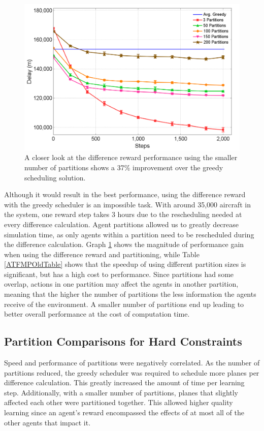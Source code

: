\documentclass[onehalf,11pt]{beavtex}
\begin{document}
\begin{figure}
\centering
\includegraphics[width=1.0\columnwidth]{ATFMPOldDvsGreedy}
\caption{A closer look at the difference reward performance using the smaller number of partitions shows a 37\% improvement over the greedy scheduling solution.}
\label{ATFMPOldDvsGreedy}
\end{figure}

Although it would result in the best performance, using the difference reward with the greedy scheduler is an impossible task. With around 35,000 aircraft in the system, one reward step takes 3 hours due to the rescheduling needed at every difference calculation. Agent partitions allowed us to greatly decrease simulation time, as only agents within a partition need to be rescheduled during the difference calculation. Graph \ref{ATFMPOldDvsGreedy} shows the magnitude of performance gain when using the difference reward and partitioning, while Table \ref{ATFMPOldTable} shows that the speedup of using different partition sizes is significant, but has a high cost to performance. Since partitions had some overlap, actions in one partition may affect the agents in another partition, meaning that the higher the number of partitions the less information the agents receive of the environment. A smaller number of partitions end up leading to better overall performance at the cost of computation time.

\subsection{Partition Comparisons for Hard Constraints}
Speed and performance of partitions were negatively correlated. As the number of partitions reduced, the greedy scheduler was required to schedule more planes per difference calculation. This greatly increased the amount of time per learning step. Additionally, with a smaller number of partitions, planes that slightly affected each other were partitioned together. This allowed higher quality learning since an agent's reward encompassed the effects of at most all of the other agents that impact it. 
\end{document}
